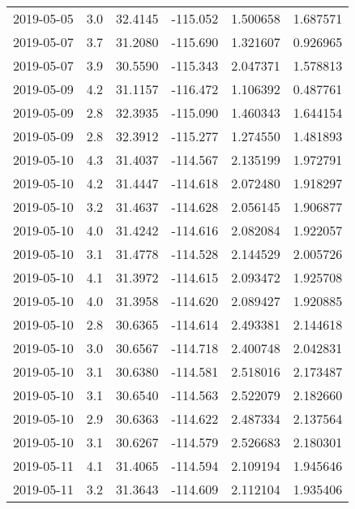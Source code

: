 \begin{tabular}{lrrrrr}
2019-05-05 &       3.0 &  32.4145 &  -115.052 &         1.500658 &         1.687571 \\
2019-05-07 &       3.7 &  31.2080 &  -115.690 &         1.321607 &         0.926965 \\
2019-05-07 &       3.9 &  30.5590 &  -115.343 &         2.047371 &         1.578813 \\
2019-05-09 &       4.2 &  31.1157 &  -116.472 &         1.106392 &         0.487761 \\
2019-05-09 &       2.8 &  32.3935 &  -115.090 &         1.460343 &         1.644154 \\
2019-05-09 &       2.8 &  32.3912 &  -115.277 &         1.274550 &         1.481893 \\
2019-05-10 &       4.3 &  31.4037 &  -114.567 &         2.135199 &         1.972791 \\
2019-05-10 &       4.2 &  31.4447 &  -114.618 &         2.072480 &         1.918297 \\
2019-05-10 &       3.2 &  31.4637 &  -114.628 &         2.056145 &         1.906877 \\
2019-05-10 &       4.0 &  31.4242 &  -114.616 &         2.082084 &         1.922057 \\
2019-05-10 &       3.1 &  31.4778 &  -114.528 &         2.144529 &         2.005726 \\
2019-05-10 &       4.1 &  31.3972 &  -114.615 &         2.093472 &         1.925708 \\
2019-05-10 &       4.0 &  31.3958 &  -114.620 &         2.089427 &         1.920885 \\
2019-05-10 &       2.8 &  30.6365 &  -114.614 &         2.493381 &         2.144618 \\
2019-05-10 &       3.0 &  30.6567 &  -114.718 &         2.400748 &         2.042831 \\
2019-05-10 &       3.1 &  30.6380 &  -114.581 &         2.518016 &         2.173487 \\
2019-05-10 &       3.1 &  30.6540 &  -114.563 &         2.522079 &         2.182660 \\
2019-05-10 &       2.9 &  30.6363 &  -114.622 &         2.487334 &         2.137564 \\
2019-05-10 &       3.1 &  30.6267 &  -114.579 &         2.526683 &         2.180301 \\
2019-05-11 &       4.1 &  31.4065 &  -114.594 &         2.109194 &         1.945646 \\
2019-05-11 &       3.2 &  31.3643 &  -114.609 &         2.112104 &         1.935406 \\

\end{tabular}
